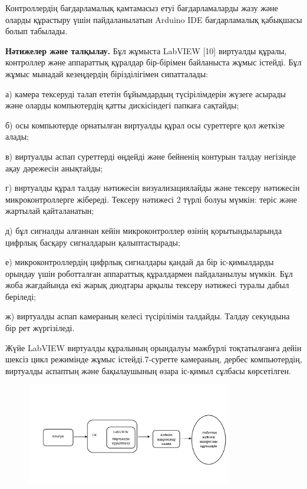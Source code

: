 Контроллердің бағдарламалық қамтамасыз етуі бағдарламаларды жазу және
оларды құрастыру үшін пайдаланылатын Arduino IDE бағдарламалық қабықшасы
болып табылады.

{\bfseries Нәтижелер және талқылау.} Бұл жұмыста LabVIEW {[}10{]} виртуалды
құралы, контроллер және аппараттық құралдар бір-бірімен байланыста жұмыс
істейді. Бұл жұмыс мынадай кезеңдердің бірізділігімен сипатталады:

а) камера тексеруді талап ететін бұйымдардың түсірілімдерін жүзеге
асырады және оларды компьютердің қатты дискісіндегі папкаға сақтайды;

б) осы компьютерде орнатылған виртуалды құрал осы суреттерге қол жеткізе
алады;

в) виртуалды аспап суреттерді өңдейді және бейненің контурын талдау
негізінде ақау дәрежесін анықтайды;

г) виртуалды құрал талдау нәтижесін визуализациялайды және тексеру
нәтижесін микроконтроллерге жібереді. Тексеру нәтижесі 2 түрлі болуы
мүмкін: теріс және жартылай қайталанатын;

д) бұл сигналды алғаннан кейін микроконтроллер өзінің қорытындыларында
цифрлық басқару сигналдарын қалыптастырады;

е) микроконтроллердің цифрлық сигналдары қандай да бір іс-қимылдарды
орындау үшін роботталған аппараттық құралдармен пайдаланылуы мүмкін. Бұл
жоба жағдайында екі жарық диодтары арқылы тексеру нәтижесі туралы дабыл
беріледі;

ж) виртуалды аспап камераның келесі түсірілімін талдайды. Талдау
секундына бір рет жүргізіледі.

Жүйе LabVIEW виртуалды құралының орындалуы мәжбүрлі тоқтатылғанға дейін
шексіз цикл режимінде жұмыс істейді.7-суретте камераның, дербес
компьютердің, виртуалды аспаптың және бақылаушының өзара іс-қимыл
сұлбасы көрсетілген.


\begin{figure}[H]
	\centering
	\includegraphics[width=0.8\textwidth]{media/ict2/image175}
	\caption*{}
\end{figure}


